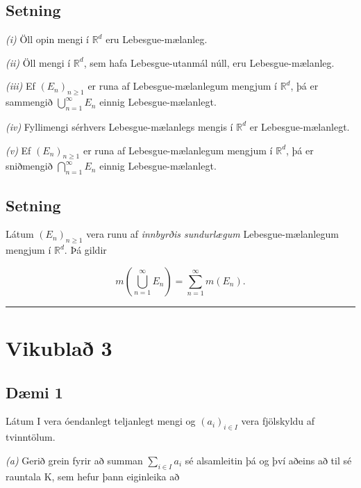 \documentclass[]{book}
\begin{document}
\hypertarget{setning-25}{%
\section{Setning}\label{setning-25}}

\emph{(i)} Öll opin mengi í \(\mathbb R^d\) eru Lebesgue-mælanleg.

\emph{(ii)} Öll mengi í \(\mathbb R^d\), sem hafa Lebesgue-utanmál núll, eru Lebesgue-mælanleg.

\emph{(iii)} Ef \((E_n)_{n\geq 1}\) er runa af Lebesgue-mælanlegum mengjum í \(\mathbb R^d\), þá er sammengið \(\bigcup_{n=1}^\infty E_n\) einnig Lebesgue-mælanlegt.

\emph{(iv)} Fyllimengi sérhvers Lebesgue-mælanlegs mengis í \(\mathbb R^d\) er Lebesgue-mælanlegt.

\emph{(v)} Ef \((E_n)_{n\geq1}\) er runa af Lebesgue-mælanlegum mengjum í \(\mathbb R^d\), þá er sniðmengið \(\bigcap_{n=1}^\infty E_n\) einnig Lebesgue-mælanlegt.

\hypertarget{setning-26}{%
\section{Setning}\label{setning-26}}

Látum \((E_n)_{n\geq1}\) vera runu af \emph{innbyrðis sundurlægum} Lebesgue-mælanlegum mengjum í \(\mathbb R^d\). Þá gildir

\[
m(\bigcup_{n=1}^\infty E_n) = \sum_{n=1}^\infty m(E_n).
\]

\begin{center}\rule{0.5\linewidth}{\linethickness}\end{center}

\hypertarget{vikubla-3}{%
\chapter*{Vikublað 3}\label{vikubla-3}}

\hypertarget{dmi-1-2}{%
\section*{Dæmi 1}\label{dmi-1-2}}

Látum I vera óendanlegt teljanlegt mengi og \((a_i)_{i\in I}\) vera fjölskyldu af tvinntölum.

\emph{(a)} Gerið grein fyrir að summan \(\sum_{i\in I} a_i\) sé alsamleitin þá og því aðeins að til sé rauntala K, sem hefur þann eiginleika að
\end{document}

